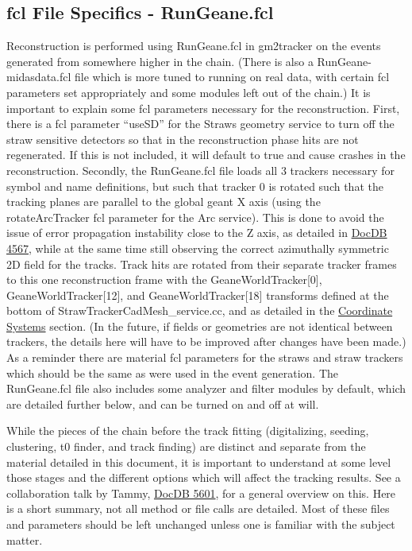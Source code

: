   \subsection{fcl File Specifics - RunGeane.fcl} 
  \label{sec:RunGeane}

    Reconstruction is performed using RunGeane.fcl in gm2tracker on the events generated from somewhere higher in the chain. (There is also a RunGeane-midasdata.fcl file which is more tuned to running on real data, with certain fcl parameters set appropriately and some modules left out of the chain.) It is important to explain some fcl parameters necessary for the reconstruction. First, there is a fcl parameter ``useSD'' for the Straws geometry service to turn off the straw sensitive detectors so that in the reconstruction phase hits are not regenerated. If this is not included, it will default to true and cause crashes in the reconstruction. Secondly, the RunGeane.fcl file loads all 3 trackers necessary for symbol and name definitions, but such that tracker 0 is rotated such that the tracking planes are parallel to the global geant X axis (using the rotateArcTracker fcl parameter for the Arc service). This is done to avoid the issue of error propagation instability close to the Z axis, as detailed in \href{http://gm2-docdb.fnal.gov:8080/cgi-bin/ShowDocument?docid=4567}{DocDB 4567}, while at the same time still observing the correct azimuthally symmetric 2D field for the tracks. Track hits are rotated from their separate tracker frames to this one reconstruction frame with the GeaneWorldTracker[0], GeaneWorldTracker[12], and GeaneWorldTracker[18] transforms defined at the bottom of StrawTrackerCadMesh\_service.cc, and as detailed in the \hyperref[sec:Coord]{Coordinate Systems} section. (In the future, if fields or geometries are not identical between trackers, the details here will have to be improved after changes have been made.) As a reminder there are material fcl parameters for the straws and straw trackers which should be the same as were used in the event generation. The RunGeane.fcl file also includes some analyzer and filter modules by default, which are detailed further below, and can be turned on and off at will.

    While the pieces of the chain before the track fitting (digitalizing, seeding, clustering, t0 finder, and track finding) are distinct and separate from the material detailed in this document, it is important to understand at some level those stages and the different options which will affect the tracking results. See a collaboration talk by Tammy, \href{http://gm2-docdb.fnal.gov:8080/cgi-bin/ShowDocument?docid=5601}{DocDB 5601}, for a general overview on this. Here is a short summary, not all method or file calls are detailed. Most of these files and parameters should be left unchanged unless one is familiar with the subject matter.

